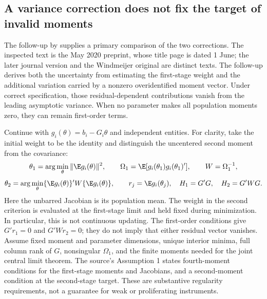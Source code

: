 \subsection{A variance correction does not fix the target of invalid moments}
\label{rel32:gmm-variance-target}
\providecommand{\USD}[1]{\ensuremath{\mathrm{USD}\,#1}}
The follow-up by \citet[Sections 2--4]{rel32hkl} supplies a primary
comparison of the two corrections. The inspected text is the May 2020
preprint, whose title page is dated 1 June; the later journal version
and the Windmeijer original are distinct texts. The follow-up derives
both the uncertainty from estimating the first-stage weight and the
additional variation carried by a nonzero overidentified moment vector.
Under correct specification, those residual-dependent contributions
vanish from the leading asymptotic variance. When no parameter makes
all population moments zero, they can remain first-order terms.

Continue with $g_i(\theta)=b_i-G_i\theta$ and independent entities.
For clarity, take the initial weight to be the identity and distinguish
the uncentered second moment from the covariance:
\[
 \theta_1=\arg\min_\theta\|\E g_i(\theta)\|^2,\qquad
 \Omega_1=\E[g_i(\theta_1)g_i(\theta_1)'],\qquad W=\Omega_1^{-1},
\]
\[
 \theta_2=\arg\min_\theta
       \{\E g_i(\theta)\}'W\{\E g_i(\theta)\},\qquad
 r_j=\E g_i(\theta_j),\quad H_1=G'G,\quad H_2=G'WG.
\]
Here the unbarred Jacobian is its population mean.
The weight in the second criterion is evaluated at the first-stage
limit and held fixed during minimization. In particular, this is not
continuous updating. The first-order conditions give $G'r_1=0$ and
$G'Wr_2=0$; they do not imply that either residual vector vanishes.
Assume fixed moment and parameter dimensions, unique interior minima,
full column rank of $G$, nonsingular $\Omega_1$, and the finite moments
needed for the joint central limit theorem. The source's Assumption 1
states fourth-moment conditions for the first-stage moments and
Jacobians, and a second-moment condition at the second-stage target.
These are substantive regularity requirements, not a guarantee for
weak or proliferating instruments.

